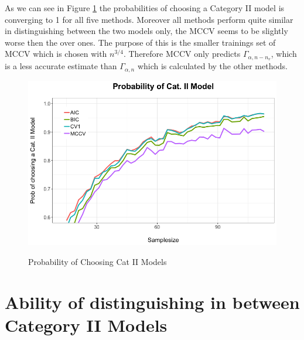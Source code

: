 \documentclass[Research_Module_ES.tex]{subfiles}
\begin{document}
As we can see in Figure \ref{Simulation1} the probabilities of choosing a Category II model is converging to 1 for all five methods. Moreover all methods perform quite similar in distinguishing between the two models only, the MCCV seems to be slightly worse then the over ones. The purpose of this is the smaller trainings set of MCCV which is chosen with $n^{3/4}$. Therefore MCCV only predicts $\Gamma_{\alpha,n-n_v}$, which is a less accurate estimate than $\Gamma_{\alpha,n}$ which is calculated by the other methods. 
\begin{figure}[h]
	\label{Simulation1}
	\centering
	\includegraphics[width=1\textwidth]{Simulation1.png}\\
\caption{Probability of Choosing Cat II Models}
\end{figure}
\section{Ability of distinguishing in between Category II Models  }
\end{document}
